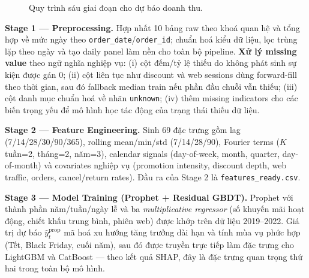\documentclass[10pt,twocolumn]{article}
\begin{document}
\begin{figure}[h]
\vspace{-2pt}
\centering
{}
\caption{Quy trình sáu giai đoạn cho dự báo doanh thu.}
\label{fig:pipeline}
\vspace{-1pt}
\end{figure}

\noindent\textbf{Stage 1 --- Preprocessing.}
Hợp nhất 10 bảng raw theo khoá quan hệ và tổng hợp về mức ngày theo
\texttt{order\_date}/\texttt{order\_id}; chuẩn hoá kiểu dữ liệu, lọc trùng
lặp theo ngày và tạo daily panel làm nền cho toàn bộ pipeline.
\textbf{Xử lý missing value} theo ngữ nghĩa nghiệp vụ: (i) cột đếm/tỷ lệ
thiếu do không phát sinh sự kiện được gán 0; (ii) cột liên tục như
discount và web sessions dùng forward-fill theo thời gian, sau đó fallback
median train nếu phần đầu chuỗi vẫn thiếu; (iii) cột danh mục chuẩn hoá
về nhãn \texttt{unknown}; (iv) thêm missing indicators cho các biến trọng
yếu để mô hình học tác động của trạng thái thiếu dữ liệu.

\noindent\textbf{Stage 2 --- Feature Engineering.}
Sinh 69 đặc trưng gồm lag (7/14/28/30/90/365), rolling mean/min/std
(7/14/28/90), Fourier terms ($K$ tuần=2, tháng=2, năm=3), calendar
signals (day-of-week, month, quarter, day-of-month) và covariates
nghiệp vụ (promotion intensity, discount depth, web traffic, orders,
cancel/return rates). Đầu ra của Stage 2 là \texttt{features\_ready.csv}.

\noindent\textbf{Stage 3 --- Model Training (Prophet + Residual GBDT).}
Prophet với thành phần năm/tuần/ngày lễ và ba \emph{multiplicative regressor}
(số khuyến mãi hoạt động, chiết khấu trung bình, phiên web) được
khớp trên dữ liệu 2019--2022. Giá trị dự báo $\hat{y}^{\text{prop}}_t$
mã hoá xu hướng tăng trưởng dài hạn và tính mùa vụ phức hợp (Tết,
Black Friday, cuối năm), sau đó được truyền trực tiếp làm đặc trưng
cho LightGBM và CatBoost --- theo kết quả SHAP, đây là đặc trưng
quan trọng thứ hai trong toàn bộ mô hình.
\end{document}
